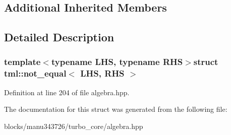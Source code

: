 \subsection*{Additional Inherited Members}


\subsection{Detailed Description}
\subsubsection*{template$<$typename L\+H\+S, typename R\+H\+S$>$struct tml\+::not\+\_\+equal$<$ L\+H\+S, R\+H\+S $>$}



Definition at line 204 of file algebra.\+hpp.



The documentation for this struct was generated from the following file\+:\begin{DoxyCompactItemize}
\item 
blocks/manu343726/turbo\+\_\+core/algebra.\+hpp\end{DoxyCompactItemize}
